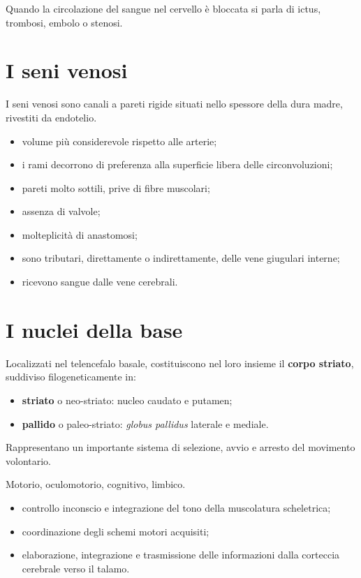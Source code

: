 Quando la circolazione del sangue nel cervello è bloccata si parla di ictus,
trombosi, embolo o stenosi.

\section{I seni venosi}

I seni venosi sono canali a pareti rigide situati nello spessore della dura
madre, rivestiti da endotelio.

\begin{itemize}
  \item volume più considerevole rispetto alle arterie;
  \item i rami decorrono di preferenza alla superficie libera delle
    circonvoluzioni;
  \item pareti molto sottili, prive di fibre muscolari;
  \item assenza di valvole;
  \item molteplicità di anastomosi;
  \item sono tributari, direttamente o indirettamente, delle vene giugulari
    interne;
  \item ricevono sangue dalle vene cerebrali.
\end{itemize}

\section{I nuclei della base}

Localizzati nel telencefalo basale, costituiscono nel loro insieme il
\textbf{corpo striato}, suddiviso filogeneticamente in:
\begin{itemize}
  \item \textbf{striato} o neo-striato: nucleo caudato e putamen;
  \item \textbf{pallido} o paleo-striato: \textit{globus pallidus} laterale e
    mediale.
\end{itemize}

Rappresentano un importante sistema di selezione, avvio e arresto del
movimento volontario.

Motorio, oculomotorio, cognitivo, limbico.

\begin{itemize}
  \item controllo inconscio e integrazione del tono della muscolatura
    scheletrica;
  \item coordinazione degli schemi motori acquisiti;
  \item elaborazione, integrazione e trasmissione delle informazioni dalla
    corteccia cerebrale verso il talamo.
\end{itemize}


